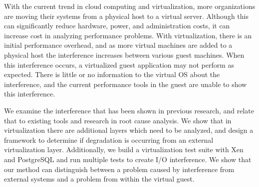 With the current trend in cloud computing and virtualization, more organizations are moving their systems from a physical host to a virtual server.  Although this can significantly reduce hardware, power, and administration costs, it can increase cost in analyzing performance problems.  With virtualization, there is an initial performance overhead, and as more virtual machines are added to a physical host the interference increases between various guest machines.   When this interference occurs, a virtualized guest application may not perform as expected.   There is little or no information to the virtual OS about the interference, and the current performance tools in the guest are unable to show this interference.

We examine the interference that has been shown in previous research, and relate that to existing tools and research in root cause analysis.  We show that in virtualization there are additional layers which need to be analyzed, and design a framework to determine if degradation is occurring from an external virtualization layer.  Additionally, we build a virtualization test suite with Xen and PostgreSQL and run multiple tests to create I/O interference.  We show that our method can distinguish between a problem caused by interference from external systems  and a problem from within the virtual guest.
 
